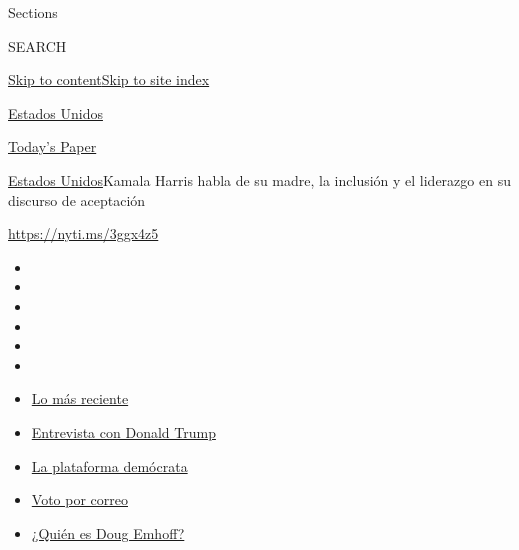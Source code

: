 Sections

SEARCH

\protect\hyperlink{site-content}{Skip to
content}\protect\hyperlink{site-index}{Skip to site index}

\href{https://www.nytimes3xbfgragh.onion/es/section/estados-unidos}{Estados
Unidos}

\href{https://myaccount.nytimes3xbfgragh.onion/auth/login?response_type=cookie\&client_id=vi}{}

\href{https://www.nytimes3xbfgragh.onion/section/todayspaper}{Today's
Paper}

\href{/es/section/estados-unidos}{Estados Unidos}\textbar{}Kamala Harris
habla de su madre, la inclusión y el liderazgo en su discurso de
aceptación

\url{https://nyti.ms/3ggx4z5}

\begin{itemize}
\item
\item
\item
\item
\item
\item
\end{itemize}

\begin{itemize}
\item
  \href{https://www.nytimes3xbfgragh.onion/es/2020/09/07/espanol/estados-unidos/trump-biden-encuestas-elecciones.html?action=click\&pgtype=Article\&state=default\&region=TOP_BANNER\&context=storylines_menu}{Lo
  más reciente}
\item
  \href{https://www.nytimes3xbfgragh.onion/es/2020/08/31/espanol/estados-unidos/donald-trump.html?action=click\&pgtype=Article\&state=default\&region=TOP_BANNER\&context=storylines_menu}{Entrevista
  con Donald Trump}
\item
  \href{https://www.nytimes3xbfgragh.onion/es/2020/08/21/espanol/estados-unidos/plataforma-democratas-espanol.html?action=click\&pgtype=Article\&state=default\&region=TOP_BANNER\&context=storylines_menu}{La
  plataforma demócrata}
\item
  \href{https://www.nytimes3xbfgragh.onion/es/article/voto-por-correo.html?action=click\&pgtype=Article\&state=default\&region=TOP_BANNER\&context=storylines_menu}{Voto
  por correo}
\item
  \href{https://www.nytimes3xbfgragh.onion/es/2020/09/11/espanol/doug-emhoff-esposo-kamala-harris.html?action=click\&pgtype=Article\&state=default\&region=TOP_BANNER\&context=storylines_menu}{¿Quién
  es Doug Emhoff?}
\end{itemize}


